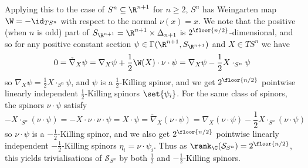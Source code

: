 \documentclass[11pt]{report}
\renewcommand{\S}{\mathcal{S}}
\begin{document}
Applying this to the case of $S^n \subseteq \R^{n + 1}$ for $n \geq 2$, $S^n$ has Weingarten map $\W = -\id_{TS^n}$ with respect to the normal $\nu(x) = x$. We note that the positive (when $n$ is odd) part of $S_{\R^{n + 1}} = \R^{n + 1} \times \Delta_{n + 1}$ is $2^{\floor{n/2}}$-dimensional, and so for any positive constant section $\psi \in \Gamma(\R^{n + 1}, S_{\R^{n + 1}})$ and $X \in TS^n$ we have
$$
    0 = \tilde\nabla_X\psi = \nabla_X\psi + \frac12\W(X) \cdot \nu \cdot \psi = \nabla_X\psi - \frac12X \cdot_{S^n}\psi
$$
so $\nabla_X\psi = \frac12 X \cdot_{S^n} \psi$, and $\psi$ is a $\frac12$-Killing spinor, and we get $2^{\floor{n/2}}$ pointwise linearly independent $\frac12$-Killing spinors $\set{\psi_i}$. For the same class of spinors, the spinors $\nu \cdot \psi$ satisfy
$$
    -X \cdot_{S^n} (\nu \cdot \psi) = -X \cdot \nu \cdot \nu \cdot \psi = X \cdot \psi = \tilde\nabla_X(\nu \cdot \psi) = \nabla_X(\nu \cdot \psi) - \frac12 X \cdot_{S^n}(\nu \cdot \psi)
$$
so $\nu \cdot \psi$ is a $-\frac12$-Killing spinor, and we also get $2^{\floor{n/2}}$ pointwise linearly independent $-\frac12$-Killing spinors $\eta_i = \nu \cdot \psi_i$. Thus as $\rank_\C(\S_{S^n}) = 2^{\floor{n/2}}$, this yields trivialisations of $\S_{S^n}$ by both $\frac12$ and $-\frac12$-Killing spinors.




\vspace*{-40pt}
\end{document}
